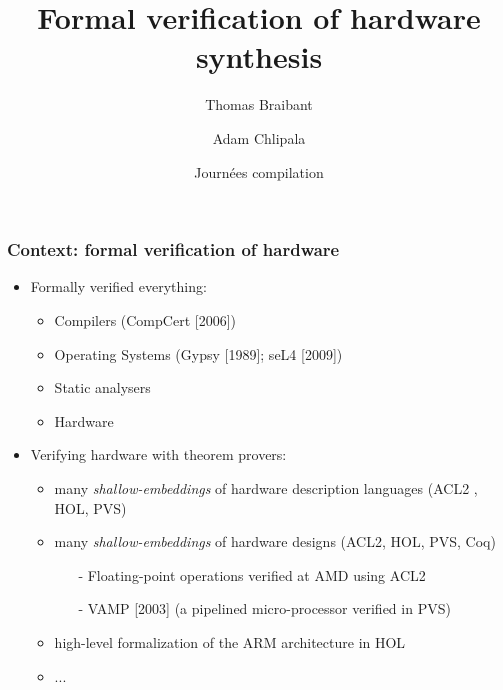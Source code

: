 \documentclass[9pt]{beamer}
\title{Formal verification of hardware synthesis}%
\author{Thomas Braibant \and Adam Chlipala}
\institute[Inria]{Inria  \and MIT CSAIL}
\date[04/2013]{Journées compilation}
\newcommand{\redemph}[1]{\alert{\emph{#1}}}
\begin{document}
\newcommand \orange[1]{{\color{orange}{#1}}}

\newcommand\parenthesis[1] {
  \begin{flushright}
    {\scriptsize \redemph{{{{ #1}}}}}
  \end{flushright}

}

\begin{frame}
  \center 
  \titlepage
\end{frame} 

\begin{frame}
  \frametitle{Context: formal verification of hardware}
  
  \begin{itemize}
  \item  Formally verified everything:
    \begin{itemize}
    \item Compilers (CompCert [2006])
    \item Operating Systems (Gypsy [1989]; seL4 [2009])
    \item Static analysers
    \item \alert<2->{Hardware}
    \end{itemize}
    
    \pause
    
  \item Verifying hardware with theorem provers:
    \begin{itemize}
    \item many \emph{shallow-embeddings} of hardware description languages (ACL2 , HOL, PVS)
    \item many \emph{shallow-embeddings} of hardware designs (ACL2, HOL, PVS, Coq) 
      \begin{itemize}
      \item[-] Floating-point operations verified at AMD using ACL2 
      \item[-] VAMP [2003]  (a pipelined micro-processor verified in PVS)
      \end{itemize}
    \item high-level formalization of the ARM architecture in HOL
    \item ...
    \end{itemize}


\end{itemize}
\end{frame}
\end{document}
